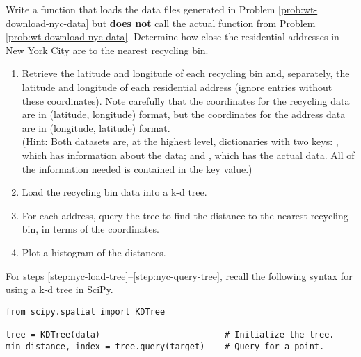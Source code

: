 \begin{problem} %
Write a function that loads the data files generated in Problem \ref{prob:wt-download-nyc-data} but \textbf{does not} call the actual function from Problem \ref{prob:wt-download-nyc-data}.
Determine how close the residential addresses in New York City are to the nearest recycling bin.
\begin{enumerate}
\item Retrieve the latitude and longitude of each recycling bin and, separately, the latitude and longitude of each residential address (ignore entries without these coordinates).
Note carefully that the coordinates for the recycling data are in (latitude, longitude) format, but the coordinates for the address data are in (longitude, latitude) format.
\\(Hint: Both datasets are, at the highest level, dictionaries with two keys: , which has information about the data; and , which has the actual data.
All of the information needed is contained in the  key value.)
\item Load the recycling bin data into a k-d tree.
\label{step:nyc-load-tree}
\item For each address, query the tree to find the distance to the nearest recycling bin, in terms of the coordinates.
\label{step:nyc-query-tree}
\item Plot a histogram of the distances.
\end{enumerate}

For steps \ref{step:nyc-load-tree}--\ref{step:nyc-query-tree}, recall the following syntax for using a k-d tree in SciPy.
\begin{lstlisting}
from scipy.spatial import KDTree

tree = KDTree(data)                         # Initialize the tree.
min_distance, index = tree.query(target)    # Query for a point.
\end{lstlisting}
\label{prob:wt-analyze-nyc-data}
\end{problem}



